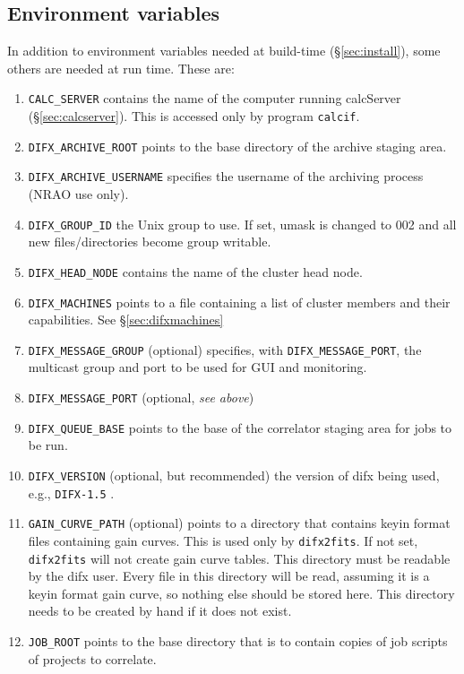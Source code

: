 \subsection{Environment variables} \label{sec:env}

In addition to environment variables needed at build-time (\S\ref{sec:install}), some others are needed at run time.
These are:
\begin{enumerate}
\item {\tt CALC\_SERVER} contains the name of the computer running calcServer (\S\ref{sec:calcserver}).
This is accessed only by program {\tt calcif}.
\item {\tt DIFX\_ARCHIVE\_ROOT} points to the base directory of the archive staging area.
\item {\tt DIFX\_ARCHIVE\_USERNAME} specifies the username of the archiving process (NRAO use only).
\item {\tt DIFX\_GROUP\_ID} the Unix group to use.  If set, umask is changed to 002 and all new files/directories become group writable. \difxoneone
\item {\tt DIFX\_HEAD\_NODE} contains the name of the cluster head node.
\item {\tt DIFX\_MACHINES} points to a file containing a list of cluster members and their capabilities.
See \S\ref{sec:difxmachines}
\item {\tt DIFX\_MESSAGE\_GROUP} (optional) specifies, with {\tt DIFX\_MESSAGE\_PORT}, the multicast group and port to be used for GUI and monitoring. \difxoneone
\item {\tt DIFX\_MESSAGE\_PORT} (optional, {\em see above}) \difxoneone
\item {\tt DIFX\_QUEUE\_BASE} points to the base of the correlator staging area for jobs to be run.  \difxonefive
\item {\tt DIFX\_VERSION} (optional, but recommended) the version of difx being used, e.g., {\tt DIFX-1.5} . \difxoneone
\item {\tt GAIN\_CURVE\_PATH} (optional) points to a directory that contains keyin format files containing gain curves.
This is used only by {\tt difx2fits}.
If not set, {\tt difx2fits} will not create gain curve tables.
This directory must be readable by the difx user.
Every file in this directory will be read, assuming it is a keyin format gain curve, so nothing else should be stored here.
This directory needs to be created by hand if it does not exist.
\item {\tt JOB\_ROOT} points to the base directory that is to contain copies of job scripts of projects to correlate.

\end{enumerate}
